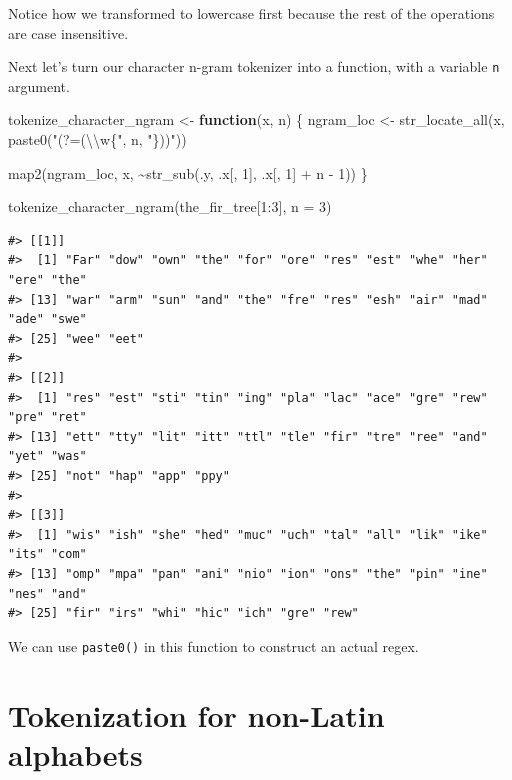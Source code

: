 \documentclass[
]{krantz}
\makeatletter
\newenvironment{Shaded}{\begin{snugshade}}{\end{snugshade}}
\newcommand{\AttributeTok}[1]{\textcolor[rgb]{0.77,0.63,0.00}{#1}}
\newcommand{\ControlFlowTok}[1]{\textcolor[rgb]{0.13,0.29,0.53}{\textbf{#1}}}
\newcommand{\DecValTok}[1]{\textcolor[rgb]{0.00,0.00,0.81}{#1}}
\newcommand{\FunctionTok}[1]{\textcolor[rgb]{0.00,0.00,0.00}{#1}}
\newcommand{\NormalTok}[1]{#1}
\newcommand{\OtherTok}[1]{\textcolor[rgb]{0.56,0.35,0.01}{#1}}
\newcommand{\SpecialCharTok}[1]{\textcolor[rgb]{0.00,0.00,0.00}{#1}}
\newcommand{\StringTok}[1]{\textcolor[rgb]{0.31,0.60,0.02}{#1}}
\newenvironment{kframe}{%
\medskip{}
\setlength{\fboxsep}{.8em}
 \def\at@end@of@kframe{}%
 \ifinner\ifhmode%
  \def\at@end@of@kframe{\end{minipage}}%
  \begin{minipage}{\columnwidth}%
 \fi\fi%
 \def\FrameCommand##1{\hskip\@totalleftmargin \hskip-\fboxsep
 \colorbox{shadecolor}{##1}\hskip-\fboxsep
     \hskip-\linewidth \hskip-\@totalleftmargin \hskip\columnwidth}%
 \MakeFramed {\advance\hsize-\width
   \@totalleftmargin\z@ \linewidth\hsize
   \@setminipage}}%
 {\par\unskip\endMakeFramed%
 \at@end@of@kframe}
\renewenvironment{Shaded}{\begin{kframe}}{\end{kframe}}
\makeatother
\begin{document}
Notice how we transformed to lowercase first because the rest of the operations are case insensitive.

Next let's turn our character n-gram tokenizer into a function, with a variable \texttt{n} argument.

\begin{Shaded}
\begin{Highlighting}[]
\NormalTok{tokenize\_character\_ngram }\OtherTok{\textless{}{-}} \ControlFlowTok{function}\NormalTok{(x, n) \{}
\NormalTok{  ngram\_loc }\OtherTok{\textless{}{-}} \FunctionTok{str\_locate\_all}\NormalTok{(x, }\FunctionTok{paste0}\NormalTok{(}\StringTok{"(?=(}\SpecialCharTok{\textbackslash{}\textbackslash{}}\StringTok{w\{"}\NormalTok{, n, }\StringTok{"\}))"}\NormalTok{))}

  \FunctionTok{map2}\NormalTok{(ngram\_loc, x, }\SpecialCharTok{\textasciitilde{}}\FunctionTok{str\_sub}\NormalTok{(.y, .x[, }\DecValTok{1}\NormalTok{], .x[, }\DecValTok{1}\NormalTok{] }\SpecialCharTok{+}\NormalTok{ n }\SpecialCharTok{{-}} \DecValTok{1}\NormalTok{))}
\NormalTok{\}}

\FunctionTok{tokenize\_character\_ngram}\NormalTok{(the\_fir\_tree[}\DecValTok{1}\SpecialCharTok{:}\DecValTok{3}\NormalTok{], }\AttributeTok{n =} \DecValTok{3}\NormalTok{)}
\end{Highlighting}
\end{Shaded}

\begin{verbatim}
#> [[1]]
#>  [1] "Far" "dow" "own" "the" "for" "ore" "res" "est" "whe" "her" "ere" "the"
#> [13] "war" "arm" "sun" "and" "the" "fre" "res" "esh" "air" "mad" "ade" "swe"
#> [25] "wee" "eet"
#> 
#> [[2]]
#>  [1] "res" "est" "sti" "tin" "ing" "pla" "lac" "ace" "gre" "rew" "pre" "ret"
#> [13] "ett" "tty" "lit" "itt" "ttl" "tle" "fir" "tre" "ree" "and" "yet" "was"
#> [25] "not" "hap" "app" "ppy"
#> 
#> [[3]]
#>  [1] "wis" "ish" "she" "hed" "muc" "uch" "tal" "all" "lik" "ike" "its" "com"
#> [13] "omp" "mpa" "pan" "ani" "nio" "ion" "ons" "the" "pin" "ine" "nes" "and"
#> [25] "fir" "irs" "whi" "hic" "ich" "gre" "rew"
\end{verbatim}

We can use \texttt{paste0()} in this function to construct an actual regex.

\hypertarget{tokenization-for-non-latin-alphabets}{%
\section{Tokenization for non-Latin alphabets}\label{tokenization-for-non-latin-alphabets}}
\end{document}
